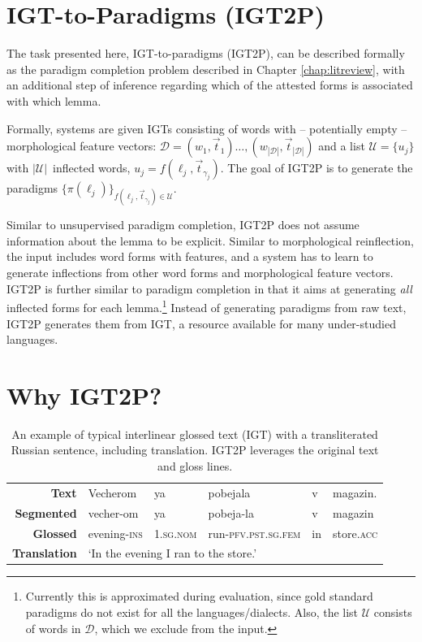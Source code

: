 \section{IGT-to-Paradigms (IGT2P)}

The task presented here, IGT-to-paradigms (IGT2P), can be described formally as the paradigm completion problem described in Chapter \ref{chap:litreview}, with an additional step of inference regarding which of the attested forms is associated with which lemma. 

Formally, systems are given IGTs consisting of words with -- potentially empty -- morphological feature vectors: $\mathcal{D}=(w_1,\vec{t}_1) \dots, (w_{|\mathcal{D}|}, \vec{t}_{|\mathcal{D}|})$ and a list $\mathcal{U} = \{u_j\}$ with $|\mathcal{U}|$~inflected words, $u_j = f(\ell_j, \vec{t}_{\gamma_j})$. The goal of IGT2P is to generate the paradigms 
$\{\pi(\ell_j)\}_{f(\ell_j, \vec{t}_{\gamma_j})\in\mathcal{U}}$.

Similar to unsupervised paradigm completion, IGT2P does not assume information about the lemma to be explicit. Similar to morphological reinflection, the input includes word forms with features, and a system has to learn to generate inflections from other word forms and morphological feature vectors. 
IGT2P is further similar to paradigm completion in that it aims at generating \textit{all} inflected forms for each lemma.\footnote{Currently this is approximated during evaluation, since gold standard paradigms do not exist for all the languages/dialects. Also, the list $\mathcal{U}$ consists of words in $\mathcal{D}$, which we exclude from the input.} Instead of generating paradigms from raw text, IGT2P generates them from IGT, a resource available for many under-studied languages.


\section{Why IGT2P?}

\begin{table}[tb]
    \centering
    \begin{tabular}{rlllll}
       \textbf{Text}  & Vecherom & ya & pobejala & v & magazin. \\
      \textbf{Segmented}   & vecher-om & ya & pobeja-la & v & magazin \\
      \textbf{Glossed} & evening-\textsc{ins} & \textsc{1.sg.nom} & run-\textsc{pfv.pst.sg.fem} & in & store.\textsc{acc} \\
      \textbf{Translation} & \multicolumn{5}{l}{`In the evening I ran to the store.'}
    \end{tabular}
    \caption[IGT example]{An example of typical interlinear glossed text (IGT) with a transliterated Russian sentence, including translation. IGT2P leverages the original text and gloss lines.}
    \label{tab:IGT}
\end{table}


